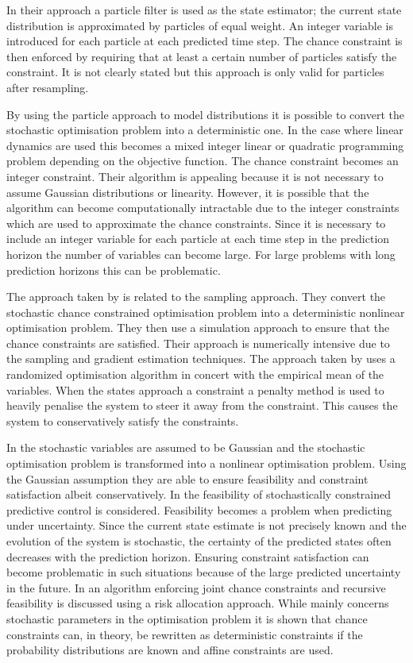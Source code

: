 In their approach a particle filter is used as the state estimator; the current state distribution is approximated by particles of equal weight. An integer variable is introduced for each particle at each predicted time step. The chance constraint is then enforced by requiring that at least a certain number of particles satisfy the constraint. It is not clearly stated but this approach is only valid for particles after resampling. 

By using the particle approach to model distributions it is possible to convert the stochastic optimisation problem into a deterministic one. In the case where linear dynamics are used this becomes a mixed integer linear or quadratic programming problem depending on the objective function. The chance constraint becomes an integer constraint. Their algorithm is appealing because it is not necessary to assume Gaussian distributions or linearity. However, it is possible that the algorithm can become computationally intractable due to the integer constraints which are used to approximate the chance constraints. Since it is necessary to include an integer variable for each particle at each time step in the prediction horizon the number of variables can become large. For large problems with long prediction horizons this can be problematic.  

The approach taken by \cite{li} is related to the sampling approach. They convert the stochastic chance constrained optimisation problem into a deterministic nonlinear optimisation problem. They then use a simulation approach to ensure that the chance constraints are satisfied. Their approach is numerically intensive due to the sampling and gradient estimation techniques. The approach taken by \cite{batina} uses a randomized optimisation algorithm in concert with the empirical mean of the variables. When the states approach a constraint a penalty method is used to heavily penalise the system to steer it away from the constraint. This causes the system to conservatively satisfy the constraints.

In \cite{li2} the stochastic variables are assumed to be Gaussian and the stochastic optimisation problem is transformed into a nonlinear optimisation problem. Using the Gaussian assumption they are able to ensure feasibility and constraint satisfaction albeit conservatively. In \cite{masahiro} the feasibility of stochastically constrained predictive control is considered. Feasibility becomes a problem when predicting under uncertainty. Since the current state estimate is not precisely known and the evolution of the system is stochastic, the certainty of the predicted states often decreases with the prediction horizon. Ensuring constraint satisfaction can become problematic in such situations because of the large predicted uncertainty in the future. In \cite{masahiro} an algorithm enforcing joint chance constraints and recursive feasibility is discussed using a risk allocation approach. While \cite{schwarm} mainly concerns stochastic parameters in the optimisation problem it is shown that chance constraints can, in theory, be rewritten as deterministic constraints if the probability distributions are known and affine constraints are used. 

